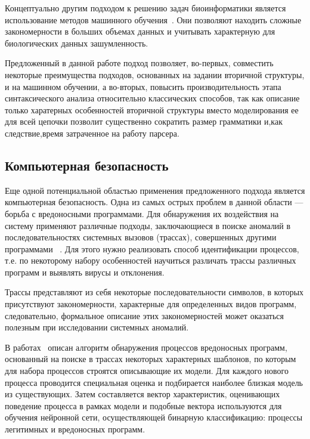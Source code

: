 \documentclass[14pt]{matmex-diploma-custom}
\begin{document}
Концептуально другим подходом к решению задач биоинформатики является использование методов машинного обучения~\cite{Humidor,ANN}. Они позволяют находить сложные закономерности в больших объемах данных и учитывать характерную для биологических данных зашумленность.

Предложенный в данной работе подход позволяет, во-первых, совместить некоторые преимущества подходов, основанных на задании вторичной структуры, и на машинном обучении, а во-вторых, повысить производительность этапа синтаксического анализа относительно классических способов, так как описание только харатерных особенностей вторичной структуры вместо моделирования ее для всей цепочки позволит существенно сократить размер грамматики и,как следствие,время затраченное на работу парсера.

\subsection{Компьютерная безопасность}
Еще одной потенциальной областью применения предложенного подхода является компьютерная безопасность. Одна из самых острых проблем в данной области --- борьба с вредоносными программами. Для обнаружения их воздействия на систему применяют различные подходы, заключающиеся в поиске аномалий в последовательностях системных вызовов (трассах), совершенных другими программами ~\cite{hofmeyr1998intrusion,wespi2000intrusion,ghosh1999study}. Для этого нужно реализовать способ идентификации процессов, т.е. по некоторому набору особенностей научиться различать трассы различных программ и выявлять вирусы и отклонения. 

Трассы представляют из себя некоторые последовательности символов, в которых присутствуют закономерности, характерные для определенных видов программ, следовательно, формальное описание этих закономерностей может оказаться полезным при исследовании системных аномалий.

В работах~\cite{баклановский2015поведенческая,баклановский2016оценка} описан алгоритм обнаружения процессов вредоносных программ, основанный на поиске в трассах некоторых характерных шаблонов, по которым для  набора процессов строятся описывающие их модели. Для каждого нового процесса проводится специальная оценка и подбирается наиболее близкая модель из существующих. Затем составляется вектор характеристик, оценивающих поведение процесса в рамках модели и подобные вектора используются для обучения нейронной сети, осуществляющей бинарную классификацию: процессы легитимных и вредоносных программ.
\end{document}
